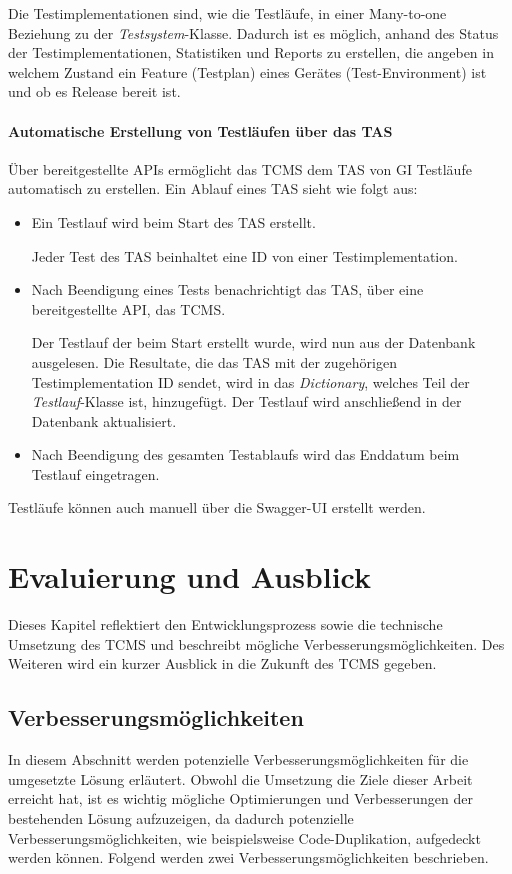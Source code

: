 \documentclass[a4paper, fontsize=11pt, parskip=half, twoside, headings=openright]{scrreprt}
\begin{document}
	Die Testimplementationen sind, wie die Testläufe, in einer Many-to-one Beziehung zu der \emph{Testsystem}-Klasse. 
	Dadurch ist es möglich, anhand des Status der Testimplementationen, Statistiken und Reports zu erstellen, die angeben in welchem Zustand ein Feature (Testplan) eines Gerätes (Test-Environment) ist und ob es Release bereit ist.
	
	\subsubsection{Automatische Erstellung von Testläufen über das TAS}
	Über bereitgestellte \ac{API}s ermöglicht das \ac{TCMS} dem \ac{TAS} von \ac{GI} Testläufe automatisch zu erstellen.
	Ein Ablauf eines \ac{TAS} sieht wie folgt aus:
	
	\begin{itemize}
		\item Ein Testlauf wird beim Start des \ac{TAS} erstellt.
		
		Jeder Test des \ac{TAS} beinhaltet eine \ac{ID} von einer Testimplementation.
		
		\item Nach Beendigung eines Tests benachrichtigt das \ac{TAS}, über eine bereitgestellte \ac{API}, das \ac{TCMS}.
		
		Der Testlauf der beim Start erstellt wurde, wird nun aus der Datenbank ausgelesen. 
		Die Resultate, die das \ac{TAS} mit der zugehörigen Testimplementation \ac{ID} sendet, wird in das \emph{Dictionary}, welches Teil der \emph{Testlauf}-Klasse ist, hinzugefügt.
		Der Testlauf wird anschließend in der Datenbank aktualisiert.
		
		\item Nach Beendigung des gesamten Testablaufs wird das Enddatum beim Testlauf eingetragen.
	\end{itemize}
	
	Testläufe können auch manuell über die Swagger-UI erstellt werden.
	
	\chapter{Evaluierung und Ausblick}
	Dieses Kapitel reflektiert den Entwicklungsprozess sowie die technische Umsetzung des \ac{TCMS} und beschreibt mögliche Verbesserungsmöglichkeiten.
	Des Weiteren wird ein kurzer Ausblick in die Zukunft des \ac{TCMS} gegeben.
	
	\section{Verbesserungsmöglichkeiten}
	In diesem Abschnitt werden potenzielle Verbesserungsmöglichkeiten für die umgesetzte Lösung erläutert.
	Obwohl die Umsetzung die Ziele dieser Arbeit erreicht hat, ist es wichtig mögliche Optimierungen und Verbesserungen der bestehenden Lösung aufzuzeigen, da dadurch potenzielle Verbesserungsmöglichkeiten, wie beispielsweise Code-Duplikation, aufgedeckt werden können.
	Folgend werden zwei Verbesserungsmöglichkeiten beschrieben.
\end{document}
